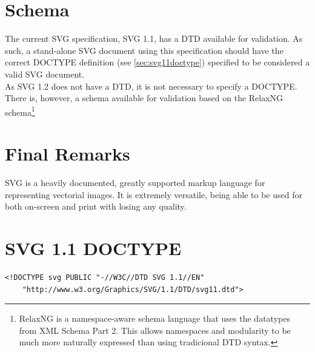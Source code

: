 \documentclass[twocolumn,twoside,10pt,a4paper]{article}
\begin{document}
\section{Schema}

The current SVG specification, SVG 1.1, has a DTD available for validation. As such, a stand-alone SVG document using this specification should have the correct DOCTYPE definition (see \ref{sec:svg11doctype}) specified to be considered a valid SVG document.\\

As SVG 1.2 does not have a DTD\cite{svg_no_dtd}, it is not necessary to specify a DOCTYPE. There is, however, a schema available for validation based on the RelaxNG schema\footnote{RelaxNG is a namespace-aware schema language that uses the datatypes from XML Schema Part 2. This allows namespaces and modularity to be much more naturally expressed than using tradicional DTD syntax.}

\section{Final Remarks}

SVG is a heavily documented, greatly supported markup language for representing vectorial images. It is extremely versatile, being able to be used for both on-screen and print with losing any quality.

\renewcommand{\bibname}{References}



\newpage
\section*{SVG 1.1 DOCTYPE}\label{sec:svg11doctype}
\tiny{
\begin{verbatim}
<!DOCTYPE svg PUBLIC "-//W3C//DTD SVG 1.1//EN"
	"http://www.w3.org/Graphics/SVG/1.1/DTD/svg11.dtd">
\end{verbatim}
}
\end{document}
